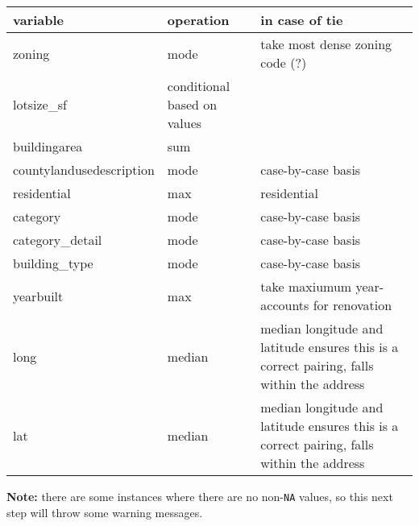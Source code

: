 \documentclass[]{article}
\begin{document}
\begin{longtable}[]{@{}lll@{}}
\toprule
variable & operation & in case of tie\tabularnewline
\midrule
\endhead
zoning & mode & take most dense zoning code (?)\tabularnewline
lotsize\_sf & conditional based on values &\tabularnewline
buildingarea & sum &\tabularnewline
countylandusedescription & mode & case-by-case basis\tabularnewline
residential & max & residential\tabularnewline
category & mode & case-by-case basis\tabularnewline
category\_detail & mode & case-by-case basis\tabularnewline
building\_type & mode & case-by-case basis\tabularnewline
yearbuilt & max & take maxiumum year- accounts for
renovation\tabularnewline
long & median & median longitude and latitude ensures this is a correct
pairing, falls within the address\tabularnewline
lat & median & median longitude and latitude ensures this is a correct
pairing, falls within the address\tabularnewline
\bottomrule
\end{longtable}

\textbf{Note:} there are some instances where there are no
non-\texttt{NA} values, so this next step will throw some warning
messages.
\end{document}
